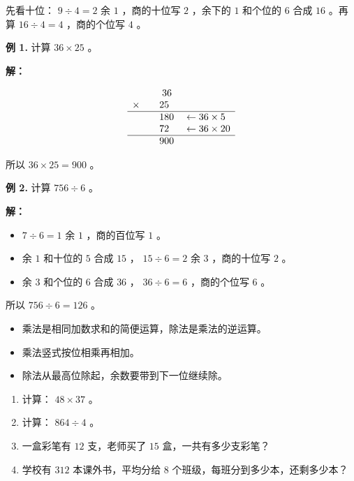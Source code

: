 先看十位： $9 \div 4 = 2$ 余 $1$ ，商的十位写 $2$ ，余下的 $1$ 和个位的 $6$ 合成 $16$ 。再算 $16 \div 4 = 4$ ，商的个位写 $4$ 。

\begin{workedexamples}


\textbf{例 1.} 计算 $36 \times 25$ 。

\textbf{解：}

\[
\begin{array}{rl}
&\phantom{\times}36 \\
\times\enspace&\phantom{0}25 \\
\hline
&\phantom{0}180 \quad \leftarrow 36 \times 5 \\
&\phantom{0}72\phantom{0} \quad \leftarrow 36 \times 20 \\
\hline
&\phantom{0}900
\end{array}
\]


所以 $36 \times 25 = 900$ 。

\textbf{例 2.} 计算 $756 \div 6$ 。

\textbf{解：}
\begin{itemize}
  \item $7 \div 6 = 1$ 余 $1$ ，商的百位写 $1$ 。
  \item 余 $1$ 和十位的 $5$ 合成 $15$ ， $15 \div 6 = 2$ 余 $3$ ，商的十位写 $2$ 。
  \item 余 $3$ 和个位的 $6$ 合成 $36$ ， $36 \div 6 = 6$ ，商的个位写 $6$ 。
\end{itemize}


所以 $756 \div 6 = 126$ 。

\end{workedexamples}

\begin{keytakeaway}


\begin{itemize}
  \item 乘法是相同加数求和的简便运算，除法是乘法的逆运算。
  \item 乘法竖式按位相乘再相加。
  \item 除法从最高位除起，余数要带到下一位继续除。
\end{itemize}


\end{keytakeaway}

\begin{practice}


\begin{enumerate}
  \item 计算： $48 \times 37$ 。
  \item 计算： $864 \div 4$ 。
  \item 一盒彩笔有 $12$ 支，老师买了 $15$ 盒，一共有多少支彩笔？
  \item 学校有 $312$ 本课外书，平均分给 $8$ 个班级，每班分到多少本，还剩多少本？
\end{enumerate}


\end{practice}

